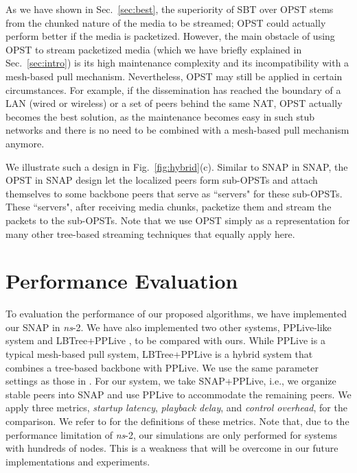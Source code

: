 \documentclass[conference]{IEEEtran}
\begin{document}
  As we have shown in Sec.~\ref{sec:best}, the superiority of SBT over OPST stems from the chunked nature of the media to be streamed; OPST could actually perform better if the media is packetized. However, the main obstacle of using OPST to stream packetized media (which we have briefly explained in Sec.~\ref{sec:intro}) is its high maintenance complexity and its incompatibility with a mesh-based pull mechanism. Nevertheless, OPST may still be applied in certain circumstances. For example, if the dissemination has reached the boundary of a LAN (wired or wireless) or a set of peers behind the same NAT, OPST actually becomes the best solution, as the maintenance becomes easy in such stub networks and there is no need to be combined with a mesh-based pull mechanism anymore.

  We illustrate such a design in Fig.~\ref{fig:hybrid}(c). Similar to SNAP in SNAP, the OPST in SNAP design let the localized peers form sub-OPSTs and attach themselves to some backbone peers that serve as ``servers" for these sub-OPSTs. These ``servers", after receiving media chunks, packetize them and stream the packets to the sub-OPSTs. Note that we use OPST simply as a representation for many other tree-based streaming techniques \cite{CastroDKNRS-SOSP03,VenkataramanYF-ICNP06,LiuSJRC-SIGMETRICS08} that equally apply here.

\section{Performance Evaluation} \label{sec:perfevl}
  To evaluation the performance of our proposed algorithms, we have implemented our SNAP in \textit{ns}-2. We have also implemented two other systems, PPLive-like system \cite{HeiLLLR-IPTV06} and LBTree+PPLive \cite{WangLX-INFOCOM08}, to be compared with ours. While PPLive is a typical mesh-based pull system, LBTree+PPLive is a hybrid system that combines a tree-based backbone with PPLive. We use the same parameter settings as those in \cite{WangLX-INFOCOM08}. For our system, we take SNAP+PPLive, i.e., we organize stable peers into SNAP and use PPLive to accommodate the remaining peers. We apply three metrics, \textit{startup latency}, \textit{playback delay}, and \textit{control overhead}, for the comparison. We refer to \cite{WangLX-INFOCOM08} for the definitions of these metrics. Note that, due to the performance limitation of \textit{ns}-2, our simulations are only performed for systems with hundreds of nodes. This is a weakness that will be overcome in our future implementations and experiments.
  
\end{document}
